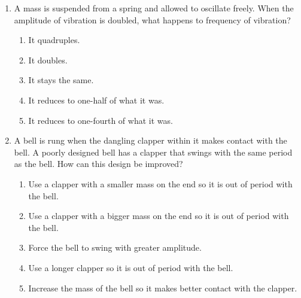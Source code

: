\documentclass{../../../oss-apphys}
\begin{document}
\begin{multicols}{2}
\begin{enumerate}[leftmargin=18pt]
  \item A mass is suspended from a spring and allowed to oscillate freely. When
    the amplitude of vibration is doubled, what happens to frequency of
    vibration?
    \begin{enumerate}[nosep,leftmargin=18pt,label=(\Alph*)]
    \item It quadruples.
    \item It doubles.
    \item It stays the same.
    \item It reduces to one-half of what it was.
    \item It reduces to one-fourth of what it was.
    \end{enumerate}
    \vspace{.7in}
    
  \item A bell is rung when the dangling clapper within it makes contact with
    the bell. A poorly designed bell has a clapper that swings with the same
    period as the bell. How can this design be improved?
    \begin{enumerate}[noitemsep,topsep=0pt,leftmargin=18pt,label=(\Alph*)]
    \item Use a clapper with a smaller mass on the end so it is out of period
      with the bell.
    \item Use a clapper with a bigger mass on the end so it is out of period
      with the bell.
    \item Force the bell to swing with greater amplitude.
    \item Use a longer clapper so it is out of period with the bell.
    \item Increase the mass of the bell so it makes better contact with the
      clapper.
    \end{enumerate}
    \columnbreak
    
%


\end{enumerate}
\end{multicols}
\end{document}
